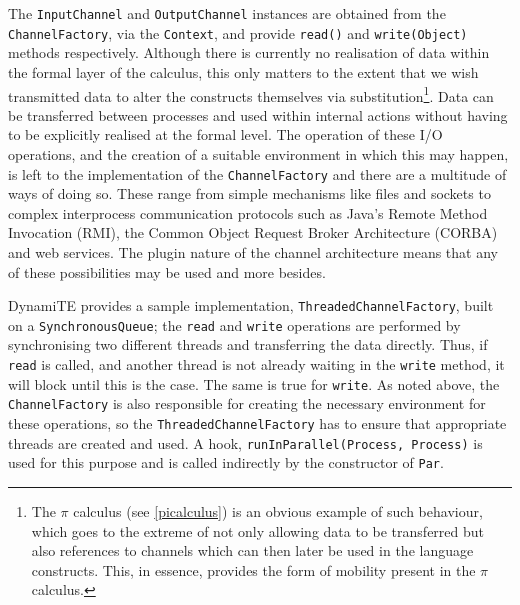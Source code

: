 The \texttt{InputChannel} and \texttt{OutputChannel} instances are
obtained from the \\ \texttt{ChannelFactory}, via the \texttt{Context},
and provide \texttt{read()} and \texttt{write(Object)} methods
respectively.  Although there is currently no realisation of data
within the formal layer of the calculus, this only matters to the
extent that we wish transmitted data to alter the constructs
themselves via substitution\footnote{The $\pi$ calculus (see
  \ref{picalculus}) is an obvious example of such behaviour, which
  goes to the extreme of not only allowing data to be transferred but
  also references to channels which can then later be used in the
  language constructs.  This, in essence, provides the form of
  mobility present in the $\pi$ calculus.}.  Data can be transferred
between processes and used within internal actions without having to
be explicitly realised at the formal level.  The operation of these
I/O operations, and the creation of a suitable environment in which
this may happen, is left to the implementation of the
\texttt{ChannelFactory} and there are a multitude of ways of doing so.
These range from simple mechanisms like files and sockets to complex
interprocess communication protocols such as Java's Remote Method
Invocation (RMI), the Common Object Request Broker Architecture
(CORBA) and web services.  The plugin nature of the channel
architecture means that any of these possibilities may be used and
more besides.

DynamiTE provides a sample implementation,
\texttt{ThreadedChannelFactory}, built on a \texttt{SynchronousQueue};
the \texttt{read} and \texttt{write} operations are performed by
synchronising two different threads and transferring the data
directly.  Thus, if \texttt{read} is called, and another thread is not
already waiting in the \texttt{write} method, it will block until this
is the case.  The same is true for \texttt{write}.  As noted above,
the \texttt{ChannelFactory} is also responsible for creating the
necessary environment for these operations, so the
\texttt{ThreadedChannelFactory} has to ensure that appropriate threads
are created and used.  A hook, \texttt{runInParallel(Process,
  Process)} is used for this purpose and is called indirectly by the
constructor of \texttt{Par}.

